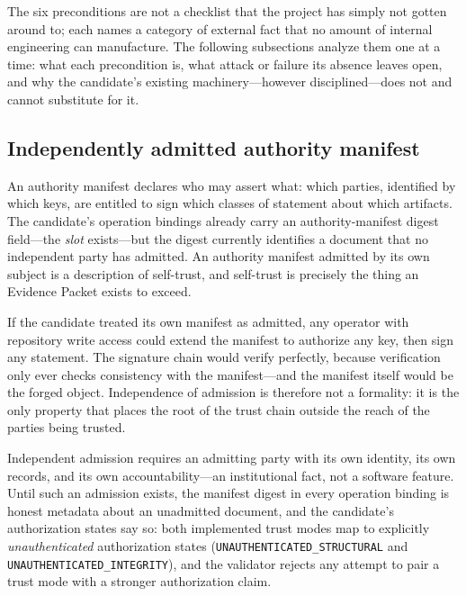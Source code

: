 The six preconditions are not a checklist that the project has simply not gotten around to; each names a category of external fact that no amount of internal engineering can manufacture. The following subsections analyze them one at a time: what each precondition is, what attack or failure its absence leaves open, and why the candidate's existing machinery---however disciplined---does not and cannot substitute for it.

\subsection{Independently admitted authority manifest}\label{elig:sec:authority}

An authority manifest declares who may assert what: which parties, identified by which keys, are entitled to sign which classes of statement about which artifacts. The candidate's operation bindings already carry an authority-manifest digest field---the \emph{slot} exists---but the digest currently identifies a document that no independent party has admitted. An authority manifest admitted by its own subject is a description of self-trust, and self-trust is precisely the thing an Evidence Packet exists to exceed.

\begin{threat}\label{elig:threat:selfauthority}
If the candidate treated its own manifest as admitted, any operator with repository write access could extend the manifest to authorize any key, then sign any statement. The signature chain would verify perfectly, because verification only ever checks consistency with the manifest---and the manifest itself would be the forged object. Independence of admission is therefore not a formality: it is the only property that places the root of the trust chain outside the reach of the parties being trusted.
\end{threat}

Independent admission requires an admitting party with its own identity, its own records, and its own accountability---an institutional fact, not a software feature. Until such an admission exists, the manifest digest in every operation binding is honest metadata about an unadmitted document, and the candidate's authorization states say so: both implemented trust modes map to explicitly \emph{unauthenticated} authorization states (\texttt{UNAUTHENTICATED\_STRUCTURAL} and \texttt{UNAUTHENTICATED\_INTEGRITY}), and the validator rejects any attempt to pair a trust mode with a stronger authorization claim.

